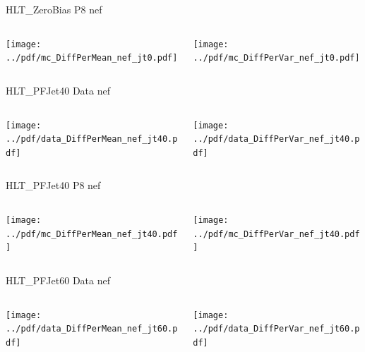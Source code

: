 \documentclass[9pt]{beamer}
\begin{document}
\begin{frame}[t]{HLT\_ZeroBias P8 nef}
\begin{columns}[T]
  \begin{column}{.5\textwidth}
  \texttt{[image: ../pdf/mc\_DiffPerMean\_nef\_jt0.pdf]}
  \end{column}
  \begin{column}{.5\textwidth}
  \texttt{[image: ../pdf/mc\_DiffPerVar\_nef\_jt0.pdf]}
  \end{column}
\end{columns}
\end{frame}

\begin{frame}[t]{HLT\_PFJet40 Data nef}
\begin{columns}[T]
  \begin{column}{.5\textwidth}
  \texttt{[image: ../pdf/data\_DiffPerMean\_nef\_jt40.pdf]}
  \end{column}
  \begin{column}{.5\textwidth}
  \texttt{[image: ../pdf/data\_DiffPerVar\_nef\_jt40.pdf]}
  \end{column}
\end{columns}
\end{frame}

\begin{frame}[t]{HLT\_PFJet40 P8 nef}
\begin{columns}[T]
  \begin{column}{.5\textwidth}
  \texttt{[image: ../pdf/mc\_DiffPerMean\_nef\_jt40.pdf]}
  \end{column}
  \begin{column}{.5\textwidth}
  \texttt{[image: ../pdf/mc\_DiffPerVar\_nef\_jt40.pdf]}
  \end{column}
\end{columns}
\end{frame}

\begin{frame}[t]{HLT\_PFJet60 Data nef}
\begin{columns}[T]
  \begin{column}{.5\textwidth}
  \texttt{[image: ../pdf/data\_DiffPerMean\_nef\_jt60.pdf]}
  \end{column}
  \begin{column}{.5\textwidth}
  \texttt{[image: ../pdf/data\_DiffPerVar\_nef\_jt60.pdf]}
  \end{column}
\end{columns}
\end{frame}
\end{document}
